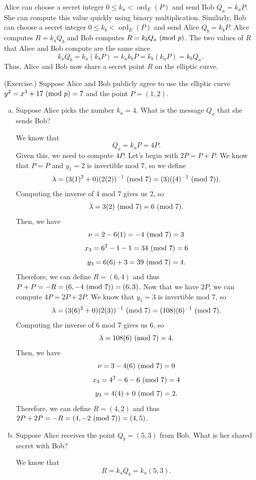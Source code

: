 \documentclass[letterpaper]{article}
\DeclareMathOperator{\ord}{ord}
\begin{document}
\bigskip 

Alice can choose a secret integer $0 \leq k_a < \ord_{E}(P)$ and send Bob $Q_a = k_a P$. She can compute this value quickly using binary multiplication. Similarly, Bob can choose a secret integer $0 \leq k_b < \ord_{E}(P)$ and send Alice $Q_b = k_b P$. Alice computes $R = k_a Q_b$ and Bob computes $R = k_b Q_a \ (\mathrm{mod}\ p)$. The two values of $R$ that Alice and Bob compute are the same since \[k_a Q_b = k_a (k_b P) = k_a k_b P = k_b (k_a P) = k_b Q_a.\]
Thus, Alice and Bob now share a secret point $R$ on the elliptic curve. 

\begin{mdframed}
    (Exercise.) Suppose Alice and Bob publicly agree to use the elliptic curve $y^2 = x^3 + 17 \ (\mathrm{mod}\ p) = 7$ and the point $P = (1, 2)$. 
    \begin{enumerate}[(a)]
        \item Suppose Alice picks the number $k_a = 4$. What is the message $Q_a$ that she sends Bob? 
        \begin{mdframed}
            We know that \[Q_a = k_a P = 4P.\] Given this, we need to compute $4P$. Let's begin with $2P = P + P$. We know that $P = P$ and $y_1 = 2$ is invertible mod 7, so we define 
            \[\lambda = (3(1)^2 + 0)(2(2))^{-1} \ (\mathrm{mod}\ 7) = (3)((4)^{-1} \ (\mathrm{mod}\ 7)).\]
            Computing the inverse of 4 mod 7 gives us 2, so 
            \[\lambda = 3(2) \ (\mathrm{mod}\ 7) = 6 \ (\mathrm{mod}\ 7).\]
            Then, we have 
            \[\nu = 2 - 6(1) = -4 \ (\mathrm{mod}\ 7) = 3\]
            \[x_3 = 6^2 - 1 - 1 = 34 \ (\mathrm{mod}\ 7) = 6\]
            \[y_3 = 6(6) + 3 = 39 \ (\mathrm{mod}\ 7) = 4.\]
            Therefore, we can define $R = (6, 4)$ and thus $P + P = -R = (6, -4 \ (\mathrm{mod}\ 7)) = (6, 3)$. Now that we have $2P$, we can compute $4P = 2P + 2P$. We know that $y_1 = 3$ is invertible mod 7, so 
            \[\lambda = (3(6)^2 + 0)(2(3))^{-1} \ (\mathrm{mod}\ 7) = (108)(6)^{-1} \ (\mathrm{mod}\ 7).\]
            Computing the inverse of 6 mod 7 gives us 6, so 
            \[\lambda = 108(6) \ (\mathrm{mod}\ 7) = 4.\]
            Then, we have 
            \[\nu = 3 - 4(6) \ (\mathrm{mod}\ 7) = 0\]
            \[x_3 = 4^2 - 6 - 6 \ (\mathrm{mod}\ 7) = 4\]
            \[y_3 = 4(4) + 0 \ (\mathrm{mod}\ 7) = 2.\]
            Therefore, we can define $R = (4, 2)$ and thus $2P + 2P = -R = (4, -2 \ (\mathrm{mod}\ 7)) = (4, 5)$.
        \end{mdframed}
        \item Suppose Alice receives the point $Q_b = (5, 3)$ from Bob. What is her shared secret with Bob?
        \begin{mdframed}
            We know that 
            \[R = k_a Q_b = k_a (5, 3).\] 
        \end{mdframed}
    \end{enumerate}
\end{mdframed}
\end{document}
